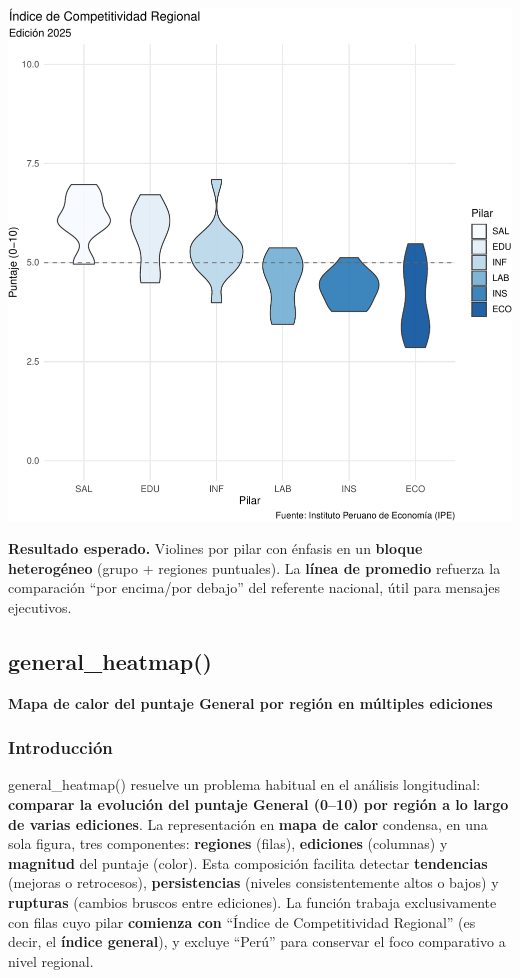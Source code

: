 \documentclass[
  11pt,
  letterpaper,
  DIV=11,
  numbers=noendperiod]{scrartcl}
\begin{document}
\includegraphics{Manual_files/figure-pdf/unnamed-chunk-30-1.pdf}

\textbf{Resultado esperado.} Violines por pilar con énfasis en un
\textbf{bloque heterogéneo} (grupo + regiones puntuales). La
\textbf{línea de promedio} refuerza la comparación ``por encima/por
debajo'' del referente nacional, útil para mensajes ejecutivos.

\subsection{\texorpdfstring{\textbf{general\_heatmap()}}{general\_heatmap()}}\label{general_heatmap}

\textbf{Mapa de calor del puntaje General por región en múltiples
ediciones}

\subsubsection{\texorpdfstring{\textbf{Introducción}}{Introducción}}\label{introducciuxf3n-5}

general\_heatmap() resuelve un problema habitual en el análisis
longitudinal: \textbf{comparar la evolución del puntaje General (0--10)
por región a lo largo de varias ediciones}. La representación en
\textbf{mapa de calor} condensa, en una sola figura, tres componentes:
\textbf{regiones} (filas), \textbf{ediciones} (columnas) y
\textbf{magnitud} del puntaje (color). Esta composición facilita
detectar \textbf{tendencias} (mejoras o retrocesos),
\textbf{persistencias} (niveles consistentemente altos o bajos) y
\textbf{rupturas} (cambios bruscos entre ediciones). La función trabaja
exclusivamente con filas cuyo pilar \textbf{comienza con} ``Índice de
Competitividad Regional'' (es decir, el \textbf{índice general}), y
excluye ``Perú'' para conservar el foco comparativo a nivel regional.
\end{document}
